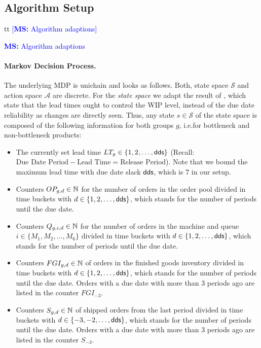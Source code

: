 \documentclass[envcountsame]{llncs}
\newcommand\MS[2][r]{\ifx t#1 \textcolor{blue}{[\textbf{MS:} #2]}
  \else \begin{center}\textcolor{blue}{\textbf{MS:} #2} \end{center} \fi}
\begin{document}
\subsection{Algorithm Setup}
\label{subsec:Algorithm_Setup}

\MS[t]{Algorithm adaptions}

\paragraph{Markov Decision Process.} The underlying MDP is unichain and looks as follows. Both,
state space $\mathcal{S}$ and action space $\mathcal{A}$ are discrete.
%
%
For the \textit{state space} we adapt the result of \citep{knollmann2013control}, which state that
the lead times ought to control the WIP level, instead of the due date reliability as changes are
directly seen. Thus, any state $s \in \mathcal{S}$ of the state space is composed of the following
information for both groups \(g\), i.e.\@ for bottleneck and non-bottleneck products:
\begin{itemize}

\item The currently set lead time $LT_{g} \in \{1,2,\ldots,\textsf{dds}\}$ (Recall:
  $\text{Due Date Period} - \text{Lead Time} = \text{Release Period}$). Note that we bound the
  maximum lead time with due date slack $\textsf{dds}$, which is $7$ in our setup.

\item Counters $OP_{g,d}\in \mathbb{N}$ for the number of orders in the order pool divided in time buckets
  with $d \in \{1,2,\ldots,\textsf{dds} \}$, which stands for the number of periods until the due date.


\item Counters $Q_{g,i,d}\in \mathbb{N}$ for the number of orders in the machine and queue \(i \in
  \{M_{1}, M_{2}, \ldots , M_{6}\}\) divided in
  time buckets with $d \in \{1,2,\ldots,\textsf{dds} \}$, which stands for the number of periods until the
  due date.

\item Counters $FGI_{g,d} \in \mathbb{N}$ of orders in the finished goods inventory divided in time
  buckets with $d \in \{1, 2,\ldots, \textsf{dds} \}$, which stands for the number of periods until the
  due date. Orders with a due date with more than 3 periods ago are listed in the counter
  $FGI_{-3}$.

\item Counters $S_{g,d} \in \mathbb{N}$ of shipped orders from the last period divided in time buckets
  with $d \in\{-3,-2,\ldots, \textsf{dds} \}$, which stands for the number of periods until the due date.
  Orders with a due date with more than 3 periods ago are listed in the counter $S_{-3}$.

\end{itemize}
\end{document}
